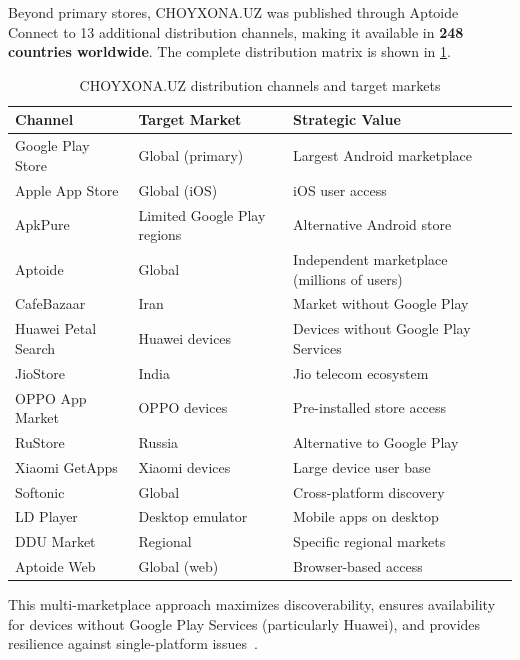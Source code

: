 Beyond primary stores, CHOYXONA.UZ was published through Aptoide Connect to 13 additional distribution channels, making it available in \textbf{248 countries worldwide}.
The complete distribution matrix is shown in \cref{tab:distribution}.

\begin{table}[htbp]
\caption{CHOYXONA.UZ distribution channels and target markets}
\label{tab:distribution}
\centering
\small
\begin{tabular}{lll}
\toprule
\textbf{Channel} & \textbf{Target Market} & \textbf{Strategic Value} \\
\midrule
Google Play Store  & Global (primary) & Largest Android marketplace \\
Apple App Store    & Global (iOS)     & iOS user access \\
\midrule
ApkPure            & Limited Google Play regions & Alternative Android store \\
Aptoide            & Global           & Independent marketplace (millions of users) \\
CafeBazaar         & Iran             & Market without Google Play \\
Huawei Petal Search & Huawei devices  & Devices without Google Play Services \\
JioStore           & India            & Jio telecom ecosystem \\
OPPO App Market    & OPPO devices     & Pre-installed store access \\
RuStore            & Russia           & Alternative to Google Play \\
Xiaomi GetApps     & Xiaomi devices   & Large device user base \\
Softonic           & Global           & Cross-platform discovery \\
LD Player          & Desktop emulator & Mobile apps on desktop \\
DDU Market         & Regional         & Specific regional markets \\
Aptoide Web        & Global (web)     & Browser-based access \\
\bottomrule
\end{tabular}
\end{table}

This multi-marketplace approach maximizes discoverability, ensures availability for devices without Google Play Services (particularly Huawei), and provides resilience against single-platform issues~\cite{jia2014}.


